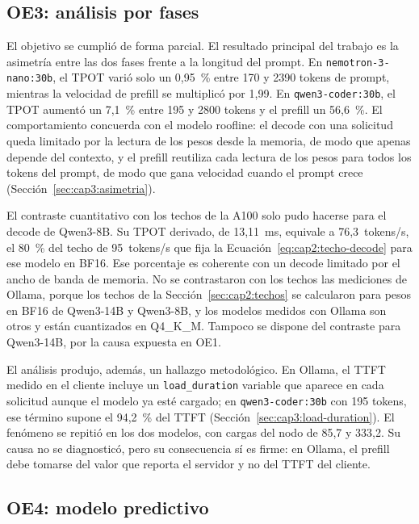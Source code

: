 \subsection{OE3: análisis por fases}

El objetivo se cumplió de forma parcial. El resultado principal del trabajo es la asimetría entre las dos fases frente a la longitud del prompt. En \texttt{nemotron-3-\allowbreak nano:\allowbreak 30b}, el TPOT varió solo un 0,95~\% entre 170 y 2390 tokens de prompt, mientras la velocidad de prefill se multiplicó por 1,99. En \texttt{qwen3-\allowbreak coder:\allowbreak 30b}, el TPOT aumentó un 7,1~\% entre 195 y 2800 tokens y el prefill un 56,6~\%. El comportamiento concuerda con el modelo roofline: el decode con una solicitud queda limitado por la lectura de los pesos desde la memoria, de modo que apenas depende del contexto, y el prefill reutiliza cada lectura de los pesos para todos los tokens del prompt, de modo que gana velocidad cuando el prompt crece (Sección~\ref{sec:cap3:asimetria}).

El contraste cuantitativo con los techos de la A100 solo pudo hacerse para el decode de Qwen3-8B. Su TPOT derivado, de 13,11~ms, equivale a 76,3~tokens/s, el 80~\% del techo de 95~tokens/s que fija la Ecuación~\ref{eq:cap2:techo-decode} para ese modelo en BF16. Ese porcentaje es coherente con un decode limitado por el ancho de banda de memoria. No se contrastaron con los techos las mediciones de Ollama, porque los techos de la Sección~\ref{sec:cap2:techos} se calcularon para pesos en BF16 de Qwen3-14B y Qwen3-8B, y los modelos medidos con Ollama son otros y están cuantizados en Q4\_K\_M. Tampoco se dispone del contraste para Qwen3-14B, por la causa expuesta en OE1.

El análisis produjo, además, un hallazgo metodológico. En Ollama, el TTFT medido en el cliente incluye un \texttt{load\_duration} variable que aparece en cada solicitud aunque el modelo ya esté cargado; en \texttt{qwen3-\allowbreak coder:\allowbreak 30b} con 195 tokens, ese término supone el 94,2~\% del TTFT (Sección~\ref{sec:cap3:load-duration}). El fenómeno se repitió en los dos modelos, con cargas del nodo de 85,7 y 333,2. Su causa no se diagnosticó, pero su consecuencia sí es firme: en Ollama, el prefill debe tomarse del valor que reporta el servidor y no del TTFT del cliente.

\subsection{OE4: modelo predictivo}

